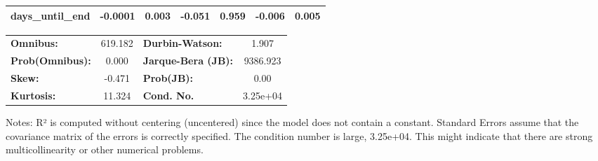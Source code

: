 \begin{center}
\begin{tabular}{lcccccc}
\textbf{days\_until\_end}             &      -0.0001  &        0.003     &    -0.051  &         0.959        &       -0.006    &        0.005     \\
\bottomrule
\end{tabular}
\begin{tabular}{lclc}
\textbf{Omnibus:}       & 619.182 & \textbf{  Durbin-Watson:     } &    1.907  \\
\textbf{Prob(Omnibus):} &   0.000 & \textbf{  Jarque-Bera (JB):  } & 9386.923  \\
\textbf{Skew:}          &  -0.471 & \textbf{  Prob(JB):          } &     0.00  \\
\textbf{Kurtosis:}      &  11.324 & \textbf{  Cond. No.          } & 3.25e+04  \\
\bottomrule
\end{tabular}
\end{center}

Notes: \newline
 [1] R² is computed without centering (uncentered) since the model does not contain a constant. \newline
 [2] Standard Errors assume that the covariance matrix of the errors is correctly specified. \newline
 [3] The condition number is large, 3.25e+04. This might indicate that there are \newline
 strong multicollinearity or other numerical problems.